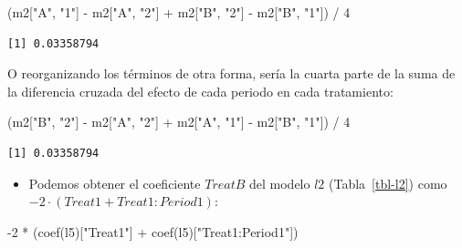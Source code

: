 \documentclass[
  12pt,
  a4paper,
  extrafontsizes,
  onecolumn,
  openright]{memoir}
\newenvironment{Shaded}{\begin{snugshade}}{\end{snugshade}}
\newcommand{\DecValTok}[1]{\textcolor[rgb]{0.68,0.00,0.00}{#1}}
\newcommand{\FunctionTok}[1]{\textcolor[rgb]{0.28,0.35,0.67}{#1}}
\newcommand{\NormalTok}[1]{\textcolor[rgb]{0.00,0.23,0.31}{#1}}
\newcommand{\SpecialCharTok}[1]{\textcolor[rgb]{0.37,0.37,0.37}{#1}}
\newcommand{\StringTok}[1]{\textcolor[rgb]{0.13,0.47,0.30}{#1}}
\providecommand{\tightlist}{%
  \setlength{\itemsep}{0pt}\setlength{\parskip}{0pt}}\usepackage{longtable,booktabs,array}
\begin{document}
\scriptsize

\begin{Shaded}
\begin{Highlighting}[]
\NormalTok{(m2[}\StringTok{"A"}\NormalTok{, }\StringTok{"1"}\NormalTok{] }\SpecialCharTok{{-}}\NormalTok{ m2[}\StringTok{"A"}\NormalTok{, }\StringTok{"2"}\NormalTok{] }\SpecialCharTok{+}\NormalTok{ m2[}\StringTok{"B"}\NormalTok{, }\StringTok{"2"}\NormalTok{] }\SpecialCharTok{{-}}\NormalTok{ m2[}\StringTok{"B"}\NormalTok{, }\StringTok{"1"}\NormalTok{]) }\SpecialCharTok{/} \DecValTok{4}
\end{Highlighting}
\end{Shaded}

\begin{verbatim}
[1] 0.03358794
\end{verbatim}

\normalsize

O reorganizando los términos de otra forma, sería la cuarta parte de la
suma de la diferencia cruzada del efecto de cada periodo en cada
tratamiento:

\scriptsize

\begin{Shaded}
\begin{Highlighting}[]
\NormalTok{(m2[}\StringTok{"B"}\NormalTok{, }\StringTok{"2"}\NormalTok{] }\SpecialCharTok{{-}}\NormalTok{ m2[}\StringTok{"A"}\NormalTok{, }\StringTok{"2"}\NormalTok{] }\SpecialCharTok{+}\NormalTok{ m2[}\StringTok{"A"}\NormalTok{, }\StringTok{"1"}\NormalTok{] }\SpecialCharTok{{-}}\NormalTok{ m2[}\StringTok{"B"}\NormalTok{, }\StringTok{"1"}\NormalTok{]) }\SpecialCharTok{/} \DecValTok{4}
\end{Highlighting}
\end{Shaded}

\begin{verbatim}
[1] 0.03358794
\end{verbatim}

\normalsize

\begin{itemize}
\tightlist
\item
  Podemos obtener el coeficiente \(TreatB\) del modelo \(l2\)
  (Tabla~\ref{tbl-l2}) como \(-2 \cdot (Treat1 + Treat1:Period1)\):
\end{itemize}

\scriptsize

\begin{Shaded}
\begin{Highlighting}[]
\SpecialCharTok{{-}}\DecValTok{2} \SpecialCharTok{*}\NormalTok{ (}\FunctionTok{coef}\NormalTok{(l5)[}\StringTok{"Treat1"}\NormalTok{] }\SpecialCharTok{+} \FunctionTok{coef}\NormalTok{(l5)[}\StringTok{"Treat1:Period1"}\NormalTok{])}
\end{Highlighting}
\end{Shaded}
\end{document}
